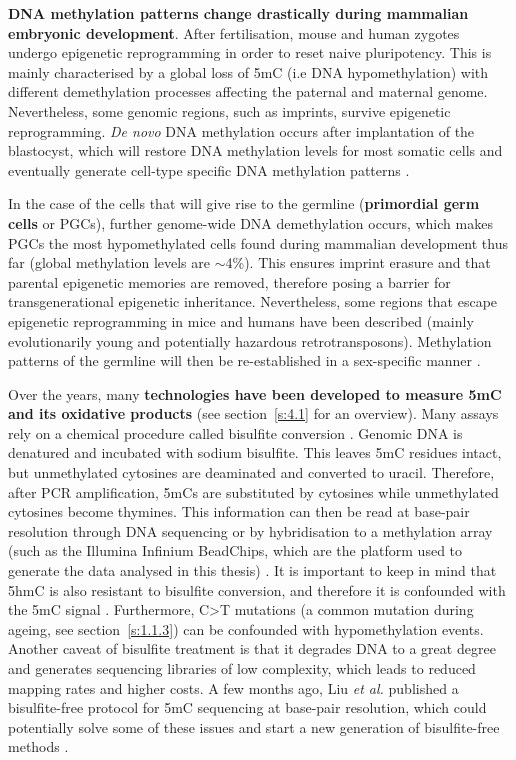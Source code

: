 \bigskip

\textbf{DNA methylation patterns change drastically during mammalian embryonic development}. After fertilisation, mouse and human zygotes undergo epigenetic reprogramming in order to reset naive pluripotency. This is mainly characterised by a global loss of 5mC (i.e DNA hypomethylation) with different demethylation processes affecting the paternal and maternal genome. Nevertheless, some genomic regions, such as imprints, survive epigenetic reprogramming. \textit{De novo} DNA methylation occurs after implantation of the blastocyst, which will restore DNA methylation levels for most somatic cells and eventually generate cell-type specific DNA methylation patterns \cite{Iurlaro2017,Tang2016,Atlasi2017}. 

\bigskip

In the case of the cells that will give rise to the germline (\textbf{primordial germ cells} or \acrshort{PGCs}), further genome-wide DNA demethylation occurs, which makes \acrshort{PGCs} the most hypomethylated cells found during mammalian development thus far (global methylation levels are $\sim$4\%). This ensures imprint erasure and that parental epigenetic memories are removed, therefore posing a barrier for transgenerational epigenetic inheritance. Nevertheless, some regions that escape epigenetic reprogramming in mice and humans have been described (mainly evolutionarily young and potentially hazardous retrotransposons). Methylation patterns of the germline will then be re-established in a sex-specific manner \cite{Tang2016}.  

\bigskip

Over the years, many \textbf{technologies have been developed to measure 5mC and its oxidative products} (see section~\ref{s:4.1} for an overview). Many assays rely on a chemical procedure called bisulfite conversion \cite{Frommer1992}. Genomic DNA is denatured and incubated with sodium bisulfite. This leaves 5mC residues intact, but unmethylated cytosines are deaminated and converted to uracil. Therefore, after PCR amplification, 5mCs are substituted by cytosines while unmethylated cytosines become thymines. This information can then be read at base-pair resolution through DNA sequencing or by hybridisation to a methylation array (such as the Illumina Infinium BeadChips, which are the platform used to generate the data analysed in this thesis) \cite{Plongthongkum2014}. It is important to keep in mind that 5hmC is also resistant to bisulfite conversion, and therefore it is confounded with the 5mC signal \cite{Wu2017}. Furthermore, C>T mutations (a common mutation during ageing, see section~\ref{s:1.1.3}) can be confounded with hypomethylation events. Another caveat of bisulfite treatment is that it degrades DNA to a great degree and generates sequencing libraries of low complexity, which leads to reduced mapping rates and higher costs. A few months ago, Liu \textit{et al.} published a bisulfite-free protocol for 5mC sequencing at base-pair resolution, which could potentially solve some of these issues and start a new generation of bisulfite-free methods \cite{Liu2019}. 

